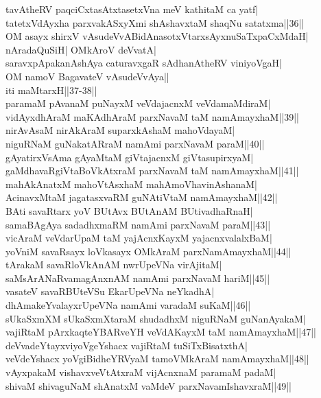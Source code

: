 \documentclass{article}
\begin{document}
tavAtheRV paqciCxtasAtxtasetxVna meV kathitaM ca yatf|\\
tatetxVdAyxha parxvakASxyXmi shAshavxtaM shaqNu satatxma||36||\\
OM asayx shirxV vAsudeVvABidAnasotxVtarxsAyxnuSaTxpaCxMdaH|\\
nAradaQuSiH| OMkAroV deVvatA|\\
saravxpApakanAshAya caturavxgaR sAdhanAtheRV viniyoVgaH|\\
OM namoV BagavateV vAsudeVvAya||\\
iti maMtarxH||37-38||\\
paramaM pAvanaM puNayxM veVdajacnxM veVdamaMdiraM|\\
vidAyxdhAraM maKAdhAraM parxNavaM taM namAmayxhaM||39||\\
nirAvAsaM nirAkAraM suparxkAshaM mahoVdayaM|\\
niguRNaM guNakatARraM namAmi parxNavaM paraM||40||\\
gAyatirxVsAma gAyaMtaM giVtajacnxM giVtasupirxyaM|\\
gaMdhavaRgiVtaBoVkAtxraM parxNavaM taM namAmayxhaM||41||\\
mahAkAnatxM mahoVtAsxhaM mahAmoVhavinAshanaM|\\
AcinavxMtaM jagatasxvaRM guNAtiVtaM namAmayxhaM||42||\\
BAti savaRtarx yoV BUtAvx BUtAnAM BUtivadhaRnaH|\\
samaBAgAya sadadhxmaRM namAmi parxNavaM paraM||43||\\
vicAraM veVdarUpaM taM yajAcnxKayxM yajacnxvalalxBaM|\\
yoVniM savaRsayx loVkasayx OMkAraM parxNamAmayxhaM||44||\\
tArakaM savaRloVkAnAM nwrUpeVNa virAjitaM|\\
saMsArANaRvamagAnxnAM namAmi parxNavaM hariM||45||\\
vasateV savaRBUteVSu EkarUpeVNa neYkadhA|\\
dhAmakeYvalayxrUpeVNa namAmi varadaM suKaM||46||\\
sUkaSxmXM sUkaSxmXtaraM shudadhxM niguRNaM guNanAyakaM|\\
vajiRtaM pArxkaqteYBARveYH veVdAKayxM taM namAmayxhaM||47||\\
deVvadeYtayxviyoVgeYshacx vajiRtaM tuSiTxBisatxthA|\\
veVdeYshacx yoVgiBidheYRVyaM tamoVMkAraM namAmayxhaM||48||\\
vAyxpakaM vishavxveVtAtxraM vijAcnxnaM paramaM padaM|\\
shivaM shivaguNaM shAnatxM vaMdeV parxNavamIshavxraM||49||\\
\end{document}
